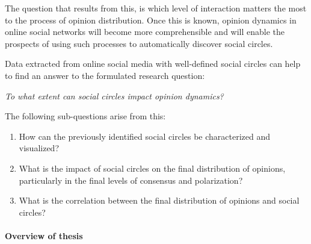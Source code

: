 The question that results from this, is which level of interaction matters the most to the process of opinion distribution. Once this is known, opinion dynamics in online social networks will become more comprehensible and will enable the prospects of using such processes to automatically discover social circles.

Data extracted from online social media with well-defined social circles can help to find an answer to the formulated research question:

\centerline{\textit{To what extent can social circles impact opinion dynamics?}}

\noindent The following sub-questions arise from this:
\begin{enumerate}
    \item How can the previously identified social circles be characterized and visualized?
    \item What is the impact of social circles on the final distribution of opinions, particularly in the final levels of consensus and polarization?
    \item What is the correlation between the final distribution of opinions and social circles?
\end{enumerate}


\paragraph{Overview of thesis}
